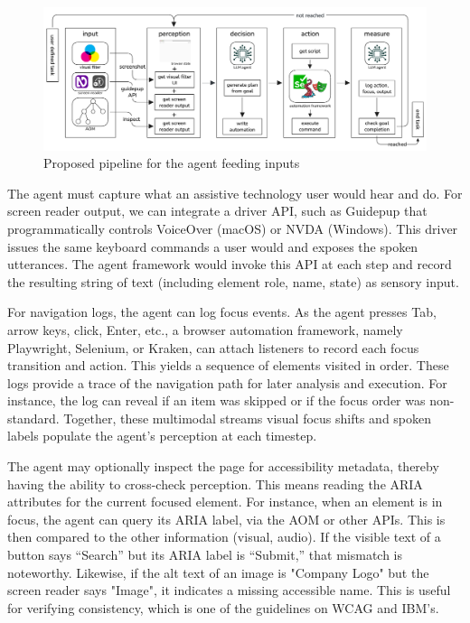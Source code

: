 \begin{figure}
    \centering
    \includegraphics[width=1\linewidth]{imgs/flow.png}
    \caption{Proposed pipeline for the agent feeding inputs}
    \vspace{-13pt}
\label{fig:pipeline}
\end{figure}

The agent must capture what an assistive technology user would hear and do. For screen reader output, we can integrate a driver API, such as Guidepup\cite{guidepup2025} that programmatically controls VoiceOver (macOS)\cite{voiceover2024} or NVDA (Windows)\cite{nvda2024}.
This driver issues the same keyboard commands a user would and exposes the spoken utterances\cite{guidepup2025}. The agent framework would invoke this API at each step and record the resulting string of text (including element role, name, state) as sensory input.

For navigation logs, the agent can log focus events. As the agent presses Tab, arrow keys, click, Enter, etc., a browser automation framework, namely Playwright\cite{playwright2025}, Selenium\cite{garcia2024selenium}, or Kraken\cite{ravelo2023kraken}, can attach listeners to record each focus transition and action. This yields a sequence of elements visited in order\cite{ravelo2023kraken}. 
These logs provide a trace of the navigation path for later analysis and execution. For instance, the log can reveal if an item was skipped or if the focus order was non-standard. Together, these multimodal streams visual focus shifts and spoken labels populate the agent's perception at each timestep. 


The agent may optionally inspect the page for accessibility metadata, thereby having the ability to cross-check perception. This means reading the ARIA attributes for the current focused element. For instance, when an element is in focus, the agent can query its ARIA label, via the \ac{AOM} or other APIs. This is then compared to the other information (visual, audio). If the visible text of a button says “Search” but its ARIA label is “Submit,” that mismatch is noteworthy. Likewise, if the alt text of an image is "Company Logo" but the screen reader says "Image", it indicates a missing accessible name. This is useful for verifying consistency, which is one of the guidelines on \ac{WCAG} and IBM's\cite{ibm2025accessibility}. 


